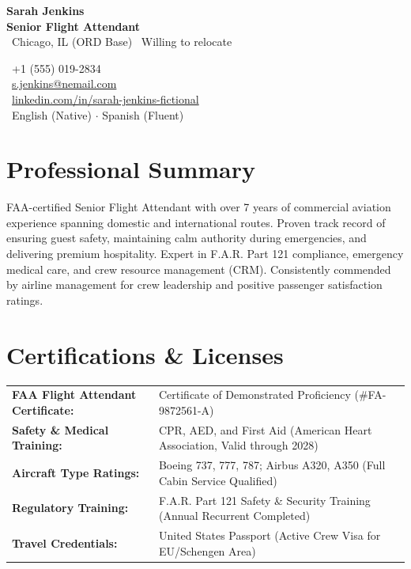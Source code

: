 \documentclass[10pt,letterpaper]{article}
\begin{document}
\begin{minipage}[t]{0.52\textwidth}
    {\Huge\bfseries\color{primary} Sarah Jenkins} \\
    \vspace{2pt}
    {\large\bfseries\color{accent} Senior Flight Attendant} \\
    \vspace{6pt}
    {\small\color{subtext}
    \faMapMarker\ Chicago, IL (ORD Base) \quad \faPlane\ Willing to relocate
    }
\end{minipage}%
\hfill
\begin{minipage}[t]{0.44\textwidth}
    \raggedleft
    {\small\color{subtext}
    \faPhone\ +1 (555) 019-2834 \\
    \faEnvelope\ \href{mailto:s.jenkins@nemail.com}{s.jenkins@nemail.com} \\
    \faLinkedin\ \href{https://linkedin.com/in/sarah-jenkins-fictional}{linkedin.com/in/sarah-jenkins-fictional} \\
    \faGlobe\ English (Native) $\cdot$ Spanish (Fluent)
    }
\end{minipage}

\vspace{8pt}

\section{Professional Summary}
FAA-certified Senior Flight Attendant with over 7 years of commercial aviation experience spanning domestic and international routes. Proven track record of ensuring guest safety, maintaining calm authority during emergencies, and delivering premium hospitality. Expert in F.A.R. Part 121 compliance, emergency medical care, and crew resource management (CRM). Consistently commended by airline management for crew leadership and positive passenger satisfaction ratings.

\section{Certifications \& Licenses}
\begin{certbox}
\small
\begin{tabular}{@{}ll@{}}
    \textbf{FAA Flight Attendant Certificate:} & Certificate of Demonstrated Proficiency (\#FA-9872561-A) \\
    \textbf{Safety \& Medical Training:} & CPR, AED, and First Aid (American Heart Association, Valid through 2028) \\
    \textbf{Aircraft Type Ratings:} & Boeing 737, 777, 787; Airbus A320, A350 (Full Cabin Service Qualified) \\
    \textbf{Regulatory Training:} & F.A.R. Part 121 Safety \& Security Training (Annual Recurrent Completed) \\
    \textbf{Travel Credentials:} & United States Passport (Active Crew Visa for EU/Schengen Area)
\end{tabular}
\end{certbox}
\end{document}
